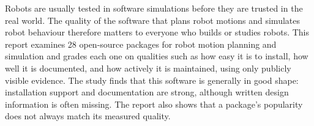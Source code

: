 
Robots are usually tested in software simulations before they are trusted in
the real world. The quality of the software that plans robot motions and
simulates robot behaviour therefore matters to everyone who builds or studies
robots. This report examines 28 open-source packages for robot
motion planning and simulation and grades each one on qualities such as how
easy it is to install, how well it is documented, and how actively it is
maintained, using only publicly visible evidence. The study finds that this
software is generally in good shape: installation support and documentation
are strong, although written design information is often missing. The report
also shows that a package's popularity does not always match its measured
quality.
